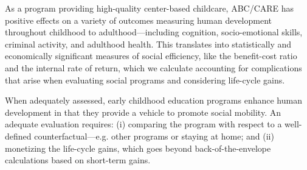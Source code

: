 As a program providing high-quality center-based childcare, ABC/CARE has positive effects on a variety of outcomes measuring human development throughout childhood to adulthood---including cognition, socio-emotional skills, criminal activity, and adulthood health. This translates into statistically and economically significant measures of social efficiency, like the benefit-cost ratio and the internal rate of return, which we calculate accounting for complications that arise when evaluating social programs and considering life-cycle gains.

When adequately assessed, early childhood education programs enhance human development in that they provide a vehicle to promote social mobility. An adequate evaluation requires: (i) comparing the program with respect to a well-defined counterfactual---e.g. other programs or staying at home; and (ii) monetizing the life-cycle gains, which goes beyond back-of-the-envelope calculations based on short-term gains.

\singlespace



 